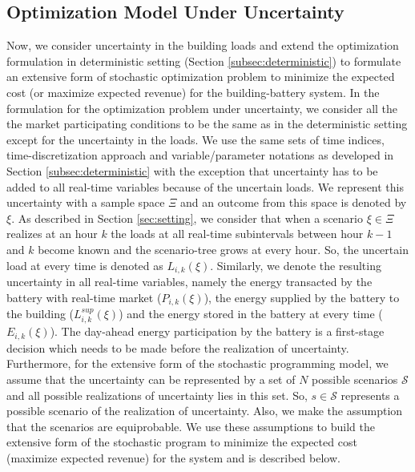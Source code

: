 \documentclass[11pt,twoside]{article}
\begin{document}
\subsection{Optimization Model Under Uncertainty} \label{subsec:opt_unc}
Now, we consider uncertainty in the building loads and extend the optimization formulation in deterministic setting (Section \ref{subsec:deterministic}) to formulate an extensive form of stochastic optimization problem to minimize the expected cost (or maximize expected revenue) for the building-battery system. In the formulation for the optimization problem under uncertainty, we consider all the the market participating conditions to be the same as in the deterministic setting except for the uncertainty in the loads. We use the same sets of time indices, time-discretization approach and variable/parameter notations as developed in Section \ref{subsec:deterministic} with the exception that uncertainty has to be added to all real-time variables because of the uncertain loads. We represent this uncertainty with a sample space $\Xi$ and an outcome from this space is denoted by $\xi$. As described in Section \ref{sec:setting}, we consider that when a scenario $\xi \in \Xi$ realizes at an hour $k$ the loads at all real-time subintervals between hour $k-1$ and $k$ become known and the scenario-tree grows at every hour. So, the uncertain load at every time is denoted as $L_{i,k}(\xi)$. Similarly, we denote the resulting uncertainty in all real-time variables, namely the energy transacted by the battery with real-time market ($P_{i,k}(\xi)$), the energy supplied by the battery to the building ($L^{sup}_{i,k}(\xi)$) and the energy stored in the battery at every time ($E_{i,k}(\xi)$). The day-ahead energy participation by the battery is a first-stage decision which needs to be made before the realization of uncertainty. Furthermore, for the extensive form of the stochastic programming model, we assume that the uncertainty can be represented by a set of $N$ possible scenarios $\mathcal{S}$ and all possible realizations of uncertainty lies in this set. So, $s \in \mathcal{S}$ represents a possible scenario of the realization of uncertainty. Also, we make the assumption that the scenarios are equiprobable. We use these assumptions to build the extensive form of the stochastic program to minimize the expected cost (maximize expected revenue) for the system and is described below.
\end{document}
